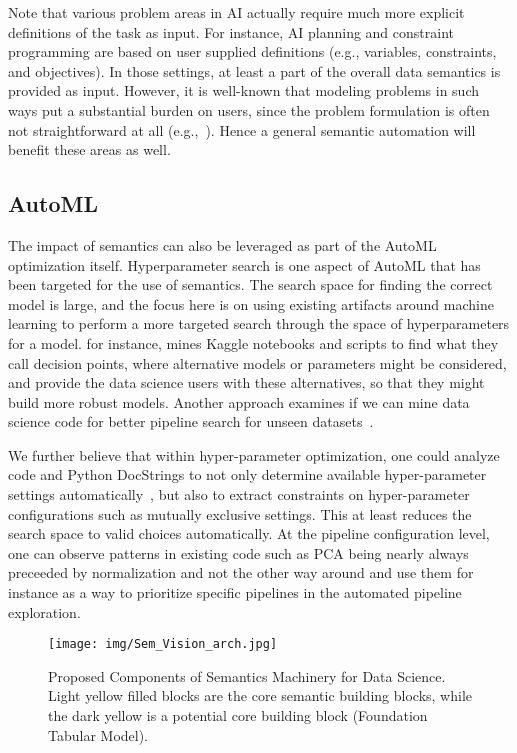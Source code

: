 \documentclass[sigconf, nonacm]{acmart}
\begin{document}
Note that various problem areas in AI actually require much more explicit definitions of the task as input. For instance, AI planning and constraint programming are based on user supplied definitions (e.g., variables, constraints, and objectives). In those settings, at least a part of the overall data semantics is provided as input. However, it is well-known that modeling problems in such ways put a substantial burden on users, since the problem formulation is often not straightforward at all (e.g.,~\cite{mipformulations, modelingCP}). Hence a general semantic automation will benefit these areas as well. 

\subsection{AutoML}
The impact of semantics can also be leveraged as part of the AutoML optimization itself. 
Hyperparameter search is one aspect of AutoML that has been targeted for the use of semantics.  The search space for finding the correct model is large, and the focus here is on using existing artifacts around machine learning to perform a more targeted search through the space of hyperparameters for a model.  \cite{10.1145/3447548.3467455} for instance, mines Kaggle notebooks and scripts to find what they call decision points, where alternative models or parameters might be considered, and provide the data science users with these alternatives, so that they might build more robust models.  
Another approach examines if we can mine data science code for better pipeline search for unseen datasets~\cite{KGPIP}.

We further believe that within hyper-parameter optimization, one could analyze code and Python DocStrings to not only determine available hyper-parameter settings automatically~\cite{hpodoc}, but also to extract constraints on hyper-parameter configurations such as mutually exclusive settings. This at least reduces the search space to valid choices automatically. %
At the pipeline configuration level, one can observe patterns in existing code such as PCA being nearly always preceeded by normalization and not the other way around and use them for instance as a way to prioritize specific pipelines in the automated pipeline exploration.

\begin{figure*}[ht]
    \centering
    \texttt{[image: img/Sem\_Vision\_arch.jpg]}
    \caption{Proposed Components of Semantics Machinery for Data Science. Light yellow filled blocks are the core semantic building blocks, while the dark yellow is a potential core building block (Foundation Tabular Model).}
    \label{fig:arch}
\end{figure*}
\end{document}
